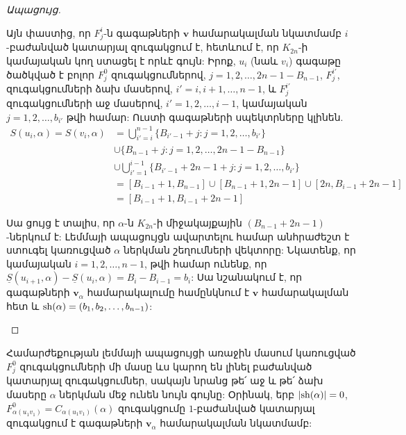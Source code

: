 \begin{proof}[Ապացույց]
\begin{description}
Այն փաստից, որ $F^i_j$-ն գագաթների $\mathbf{v}$ համարակալման նկատմամբ $i$-բաժանված կատարյալ զուգակցում է, հետևում է, որ $K_{2n}$-ի կամայական կող ստացել է որևէ գույն: Իրոք, $u_i$ (նաև $v_i$) գագաթը ծածկված է բոլոր $F_j^0$ զուգակցումներով, $j=1,2,\ldots,2n-1-B_{n-1}$, $F_j^{i'}$, զուգակցումների ձախ մասերով, $i'=i,i+1,\ldots,n-1$, և $F_j^{i'}$ զուգակցումների աջ մասերով, $i'=1,2,\ldots,i-1$, կամայական $j=1,2,\ldots,b_{i'}$ թվի համար: Ուստի գագաթների սպեկտրները կլինեն.
\begin{align*}
S(u_i, \alpha) = S(v_i, \alpha) &= \bigcup\limits_{i'=i}^{n-1}\{B_{i'-1} + j  : j=1,2,\ldots,b_{i'}\} \\
& \cup
\{B_{n-1} + j : j=1,2,\ldots,2n-1-B_{n-1}\} \\
& \cup
\bigcup\limits_{i'=1}^{i-1}\{B_{i'-1} + 2n-1 + j  : j=1,2,\ldots,b_{i'}\}\\
&= [B_{i-1}+1, B_{n-1}] \cup [B_{n-1}+1, 2n-1] \cup [2n, B_{i-1}+2n-1]\\
&= [B_{i-1}+1, B_{i-1}+2n-1]
\end{align*}

Սա ցույց է տալիս, որ $\alpha$-ն $K_{2n}$-ի  միջակայքային $(B_{n-1} + 2n-1)$-ներկում է: Լեմմայի ապացույցն ավարտելու համար անհրաժեշտ է ստուգել կառուցված $\alpha$ ներկման շեղումների վեկտորը: Նկատենք, որ կամայական $i=1,2,\ldots,n-1$, թվի համար ունենք, որ $\underline{S}(u_{i+1}, \alpha) - \underline{S}(u_{i}, \alpha) = B_{i}-B_{i-1} = b_i$: Սա նշանակում է, որ գագաթների $\mathbf{v}_\alpha$ համարակալումը համընկնում է $\mathbf{v}$ համարակալման հետ և ${\rm sh}(\alpha) = (b_1, b_2, \ldots, b_{n-1})$:
\end{description}

\end{proof}

\begin{remark}\label{splittedSameColor}
Համարժեքության լեմմայի ապացույցի առաջին մասում կառուցված $F_j^0$ զուգակցումների մի մասը ևս կարող են լինել բաժանված կատարյալ զուգակցումներ, սակայն նրանց թե՛ աջ և թե՛ ձախ մասերը $\alpha$ ներկման մեջ ունեն նույն գույնը: Օրինակ, երբ $|{\rm sh}(\alpha)|=0$, $F^0_{\alpha(u_1v_1)} = C_{\alpha(u_1v_1)}(\alpha)$ զուգակցումը $1$-բաժանված կատարյալ զուգակցում է գագաթների $\mathbf{v}_\alpha$ համարակալման նկատմամբ:
\end{remark}

